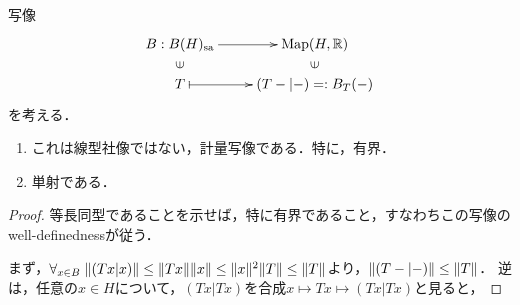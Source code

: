 \documentclass[uplatex,dvipdfmx]{jsreport}
\begin{document}
\begin{lemma}[数域：自己共役作用素に特徴的な対象]\label{lemma-numerical-range}
    写像
    \[\xymatrix@R-2pc{
        B:B(H)_\sa\ar[r]&\Map(H,\R)\\
        \rotatebox[origin=c]{90}{$\in$}&\rotatebox[origin=c]{90}{$\in$}\\
        T\ar@{|->}[r]&(T-|-)=:B_T(-)
    }\]
    を考える．
    \begin{enumerate}
        \item これは線型社像ではない，計量写像である．特に，有界．
        \item 単射である．
    \end{enumerate}
\end{lemma}
\begin{proof}
    等長同型であることを示せば，特に有界であること，すなわちこの写像のwell-definednessが従う．

    まず，$\forall_{x\in B}\;\|(Tx|x)\|\le\|Tx\|\|x\|\le\|x\|^2\|T\|\le\|T\|$より，$\|(T-|-)\|\le\|T\|$．
    逆は，任意の$x\in H$について，$(Tx|Tx)$を合成$x\mapsto Tx\mapsto (Tx|Tx)$と見ると，
\end{proof}
\end{document}
